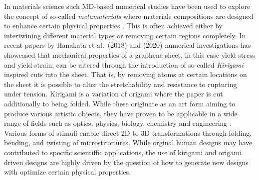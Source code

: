 In materials science such \acrshort{MD}-based numerical studies have been used to explore the concept of so-called \textit{metamaterials} where materials compositions are
designed to enhance certain physical properties
\cite{PhysRevLett.121.255304}\cite{PhysRevResearch.2.042006}\cite{graphene/hBN}\cite{Mao}\cite{Yang}\cite{Forte}.
This is often achieved either by intertwining different material types or
removing certain regions completely. In recent papers by Hanakata et al.\
\cite{PhysRevLett.121.255304}(2018) and \cite{PhysRevResearch.2.042006}(2020)
numerical investigations has showcased that mechanical properties of a graphene
sheet, in this case yield stress and yield strain, can be altered through the
introduction of so-called \textit{Kirigami} inspired cuts into the sheet. That
is, by removing atoms at certain locations on the sheet it is possible to alter
the stretchability and resistance to rupturing under tension. Kirigami is a
variation of origami where the paper is cut additionally to being folded. While
these originate as an art form aiming to produce various artistic objects, they
have proven to be applicable in a wide range of fields such as optics, physics,
biology, chemistry and engineering \cite{chen_kirigamiorigami_2020}. Various
forms of stimuli enable direct 2D to 3D transformations through folding,
bending, and twisting of microstructures. While orginal human designs may have contributed to specific scientiffic applications, the use of kirigami and
origami driven designs are highly driven by the question of how to generate new designs with optimize certain physical properties.




